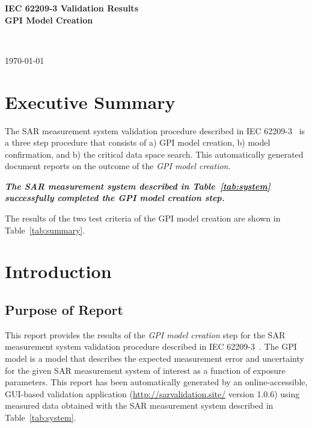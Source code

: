 \documentclass{article}
\begin{document}
\flushright
\begin{Large}
\textbf{IEC 62209-3 Validation Results} \\
\textbf{GPI Model Creation}
\end{Large} \\
\begin{small}
\today \\ \currenttime
\end{small}
\flushleft

\section{Executive Summary}\label{sec:exec_summary}

The SAR measurement system validation procedure described in IEC 62209-3~\cite{standard} is a three step procedure that consists of a) GPI model creation, b) model confirmation, and b) the critical data space search. This automatically generated document reports on the outcome of the \textit{GPI model creation}.

\textbf{\textit{The SAR measurement system described in Table~\ref{tab:system} successfully completed the GPI model creation step.}}

The results of the two test criteria of the GPI model creation are shown in Table~\ref{tab:summary}.





\section{Introduction}\label{sec:start}

\subsection{Purpose of Report}\label{sec:intro}
This report provides the results of the\textit{ GPI model creation} step for the SAR measurement system validation procedure described in IEC 62209-3~\cite{standard}. The GPI model is a model that describes the expected measurement error and uncertainty for the given SAR measurement system of interest as a function of exposure parameters. This report has been automatically generated by an online-accessible, GUI-based validation application (\url{http://sarvalidation.site/} version 1.0.6) using measured data obtained with the SAR measurement system described in Table~\ref{tab:system}.
\end{document}
